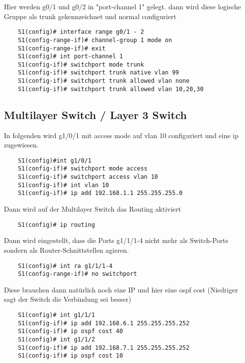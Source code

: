 \documentclass[asp2.tex]{subfiles}
\begin{document}
 Hier werden g0/1 und g0/2 in "port-channel 1" gelegt. dann wird diese logische Gruppe als trunk 
 gekennzeichnet und normal configuriert

\begin{lstlisting}
    S1(config)# interface range g0/1 - 2
    S1(config-range-if)# channel-group 1 mode on
    S1(config-range-if)# exit
    S1(config)# int port-channel 1
    S1(config-if)# switchport mode trunk
    S1(config-if)# switchport trunk native vlan 99
    S1(config-if)# switchport trunk allowed vlan none
    S1(config-if)# switchport trunk allowed vlan 10,20,30
\end{lstlisting}

\subsection{Multilayer Switch / Layer 3 Switch}

In folgenden wird g1/0/1 mit access mode auf vlan 10 configuriert und eine ip zugewiesen.

\begin{lstlisting}
    S1(config)#int g1/0/1
    S1(config-if)# switchport mode access
    S1(config-if)# switchport access vlan 10
    S1(config-if)# int vlan 10
    S1(config-if)# ip add 192.168.1.1 255.255.255.0
\end{lstlisting}

Dann wird auf der Multilayer Switch das Routing aktiviert

\begin{lstlisting}
    S1(config)# ip routing
\end{lstlisting}

Dann wird eingestellt, dass die Ports g1/1/1-4 nicht mehr als Switch-Ports sondern als Router-Schnittstellen agieren.

\begin{lstlisting}
    S1(config)# int ra g1/1/1-4
    S1(config-range-if)# no switchport
\end{lstlisting}

Diese brauchen dann natürlich noch eine IP und hier eine ospf cost (Niedriger sagt der Switch die Verbindung sei besser)

\begin{lstlisting}
    S1(config)# int g1/1/1
    S1(config-if)# ip add 192.168.6.1 255.255.255.252
    S1(config-if)# ip ospf cost 40
    S1(config)# int g1/1/2
    S1(config-if)# ip add 192.168.7.1 255.255.255.252
    S1(config-if)# ip ospf cost 10
\end{lstlisting}
\end{document}
